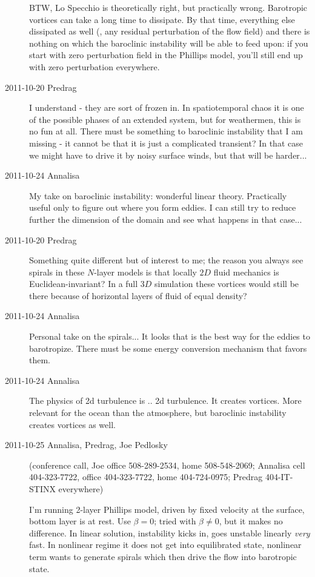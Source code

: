 \begin{description}
BTW, Lo Specchio  is theoretically right, but practically wrong.
Barotropic vortices can take a long time to dissipate. By that time,
everything else dissipated as well (\ie, any residual perturbation of the
flow field) and there is nothing on which the baroclinic instability will
be able to feed upon: if you start with zero perturbation field in the
Phillips model, you'll still end up with zero perturbation everywhere.

\item[2011-10-20 Predrag] I understand - they are sort of frozen in. In
spatiotemporal chaos it is one of the possible phases of an extended
system, but for weathermen, this is no fun at all. There must be
something to baroclinic instability that I am missing - it cannot be that it
is just a complicated transient? In that case we might have to drive it
by noisy surface winds, but that will be harder...

\item[2011-10-24 Annalisa]
My take on baroclinic instability: wonderful linear theory. Practically
useful only to figure out where you form eddies. I can still try to
reduce further the dimension of the domain and see what happens in that
case...

\item[2011-10-20 Predrag] Something quite different but of interest to me;
the reason you always see spirals in these $N$-layer models is that locally
$2D$ fluid mechanics is Euclidean-invariant? In a full $3D$ simulation these
vortices would still be there because of horizontal layers of fluid of equal density?

\item[2011-10-24 Annalisa]
Personal take on the spirals... It looks that is the best way for the
eddies to barotropize. There must be some energy conversion mechanism
that favors them.

\item[2011-10-24 Annalisa]
The physics of 2d turbulence is .. 2d turbulence. It creates vortices.
More relevant for the ocean than the atmosphere, but baroclinic
instability creates vortices as well.

\item[2011-10-25 Annalisa, Predrag, Joe Pedlosky] (conference call,
Joe office 508-289-2534, home 508-548-2069;
Annalisa cell 404-323-7722, office 404-323-7722, home 404-724-0975;
Predrag 404-IT-STINX everywhere)

 I'm running 2-layer Phillips model, driven by fixed velocity at
the surface, bottom layer is at rest. Use $\beta=0$; tried with $\beta
\neq 0$, but it makes no difference. In linear solution, instability
kicks in, goes unstable linearly \emph{very} fast. In nonlinear regime it
does not get into equilibrated state, nonlinear term wants to generate
spirals which then drive the flow into barotropic state.


\end{description}
